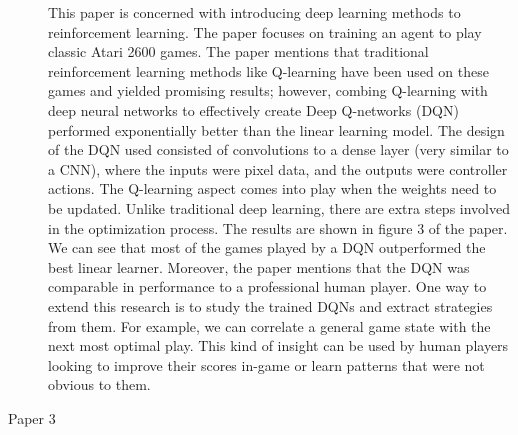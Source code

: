 \documentclass[12pt]{article}
\begin{document}
\begin{description}
    This paper is concerned with introducing deep learning methods to
    reinforcement learning. The paper focuses on training an agent to play
    classic Atari 2600 games. The paper mentions that traditional reinforcement
    learning methods like Q-learning have been used on these games and yielded
    promising results; however, combing Q-learning with deep neural networks to
    effectively create Deep Q-networks (DQN) performed exponentially better
    than the linear learning model. The design of the DQN used consisted of
    convolutions to a dense layer (very similar to a CNN), where the inputs
    were pixel data, and the outputs were controller actions. The Q-learning
    aspect comes into play when the weights need to be updated. Unlike
    traditional deep learning, there are extra steps involved in the
    optimization process. The results are shown in figure 3 of the paper. We
    can see that most of the games played by a DQN outperformed the best linear
    learner. Moreover, the paper mentions that the DQN was comparable in
    performance to a professional human player. One way to extend this research
    is to study the trained DQNs and extract strategies from them. For example,
    we can correlate a general game state with the next most optimal play. This
    kind of insight can be used by human players looking to improve their
    scores in-game or learn patterns that were not obvious to them.


    \item[Paper 3]

    

\end{description}
\end{document}
